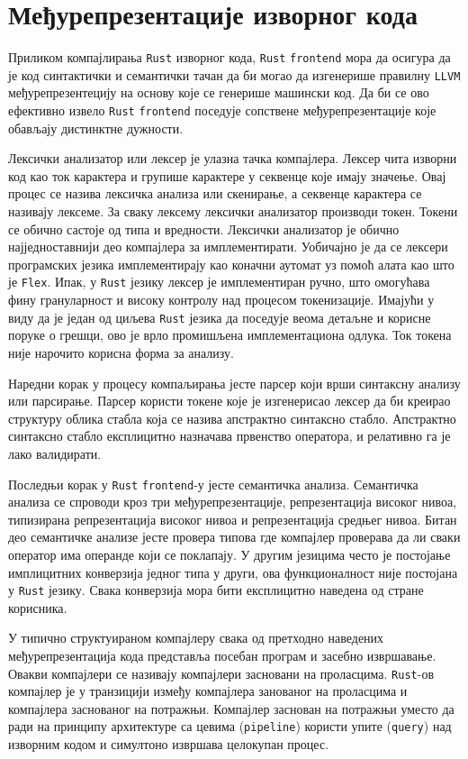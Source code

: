 \section{Међурепрезентације изворног кода}

Приликом компајлирања \verb|Rust| изворног кода, \verb|Rust| \verb|frontend| мора да осигура да је 
код синтактички и семантички тачан да би могао да изгенерише правилну \verb|LLVM| међурепрезентецију 
на основу које се генерише машински код. Да би се ово ефективно извело \verb|Rust| \verb|frontend| поседује 
сопствене међурепрезентације које обављају дистинктне дужности. 

Лексички анализатор или лексер је улазна тачка компајлера. Лексер чита изворни код као ток карактера и групише карактере 
у секвенце које имају значење. Овај процес се назива лексичка анализа или скенирање, а секвенце карактера се називају лексеме. 
За сваку лексему лексички анализатор производи токен. Токени се обично састоје од типа и вредности.
Лексички анализатор је обично најједноставнији део компајлера за имплементирати. 
Уобичајно је да се лексери програмских језика имплементирају као коначни аутомат уз помоћ алата као што 
је \verb|Flex|. Ипак, у \verb|Rust| језику лексер је имплементиран ручно, што омогућава фину грануларност 
и високу контролу над процесом токенизације. Имајући у виду да је један од циљева \verb|Rust| језика 
да поседује веома детаљне и корисне поруке о грешци, ово је врло промишљена имплементациона одлука. 
Ток токена није нарочито корисна форма за анализу.

Наредни корак у процесу компаљирања јесте парсер који врши синтаксну анализу или парсирање. 
Парсер користи токене које је изгенерисао лексер да би креирао структуру облика стабла која се назива 
апстрактно синтаксно стабло. Апстрактно синтаксно стабло експлицитно назначава првенство оператора,
и релативно га је лако валидирати.

Последњи корак у \verb|Rust| \verb|frontend|-у јесте семантичка анализа. Семантичка анализа се спроводи 
кроз три међурепрезентације, репрезентација високог нивоа, типизирана репрезентација високог нивоа
и репрезентација средњег нивоа. Битан део семантичке анализе јесте провера типова где компајлер проверава 
да ли сваки оператор има операнде који се поклапају. У другим језицима често је постојање имплицитних 
конверзија једног типа у други, ова функционалност није постојана у \verb|Rust| језику. Свака конверзија 
мора бити експлицитно наведена од стране корисника.

У типично структуираном компајлеру свака од претходно наведених међурепрезентација кода представља 
посебан програм и засебно извршавање. Овакви компајлери се називају 
компајлери засновани на проласцима. \verb|Rust|-ов компајлер је у транзицији између 
компајлера занованог на проласцима и компајлера заснованог на потражњи. Компајлер 
заснован на потражњи уместо да ради на принципу архитектуре са цевима (\verb|pipeline|)
користи упите (\verb|query|) над изворним кодом и симултоно извршава целокупан процес.

